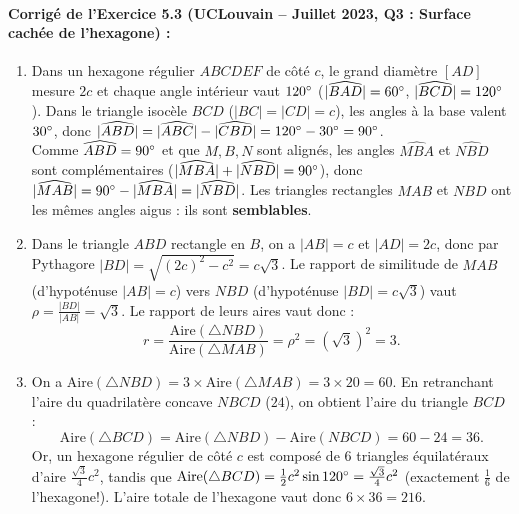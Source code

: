 \paragraph{Corrigé de l'Exercice 5.3 (UCLouvain -- Juillet 2023, Q3 : Surface cachée de l'hexagone) :}
\begin{enumerate}[label=(\alph*)]
    \item Dans un hexagone régulier $ABCDEF$ de côté $c$, le grand diamètre $[AD]$ mesure $2c$ et chaque angle intérieur vaut $120\degree$ ($|\widehat{BAD}| = 60\degree$, $|\widehat{BCD}| = 120\degree$). Dans le triangle isocèle $BCD$ ($|BC|=|CD|=c$), les angles à la base valent $30\degree$, donc $|\widehat{ABD}| = |\widehat{ABC}| - |\widehat{CBD}| = 120\degree - 30\degree = 90\degree$.\\
    Comme $\widehat{ABD} = 90\degree$ et que $M, B, N$ sont alignés, les angles $\widehat{MBA}$ et $\widehat{NBD}$ sont complémentaires ($|\widehat{MBA}| + |\widehat{NBD}| = 90\degree$), donc $|\widehat{MAB}| = 90\degree - |\widehat{MBA}| = |\widehat{NBD}|$. Les triangles rectangles $MAB$ et $NBD$ ont les mêmes angles aigus : ils sont \textbf{semblables}.
    \item Dans le triangle $ABD$ rectangle en $B$, on a $|AB| = c$ et $|AD| = 2c$, donc par Pythagore $|BD| = \sqrt{(2c)^2 - c^2} = c\sqrt{3}$. Le rapport de similitude de $MAB$ (d'hypoténuse $|AB| = c$) vers $NBD$ (d'hypoténuse $|BD| = c\sqrt{3}$) vaut $\rho = \frac{|BD|}{|AB|} = \sqrt{3}$. Le rapport de leurs aires vaut donc :
    \[
        r = \frac{\text{Aire}(\triangle NBD)}{\text{Aire}(\triangle MAB)} = \rho^2 = (\sqrt{3})^2 = \boxed{3}.
    \]
    \item On a $\text{Aire}(\triangle NBD) = 3 \times \text{Aire}(\triangle MAB) = 3 \times 20 = 60$. En retranchant l'aire du quadrilatère concave $NBCD$ ($24$), on obtient l'aire du triangle $BCD$ :
    \[
        \text{Aire}(\triangle BCD) = \text{Aire}(\triangle NBD) - \text{Aire}(NBCD) = 60 - 24 = 36.
    \]
    Or, un hexagone régulier de côté $c$ est composé de $6$ triangles équilatéraux d'aire $\frac{\sqrt{3}}{4}c^2$, tandis que $\text{Aire}(\triangle BCD) = \frac{1}{2}c^2\sin 120\degree = \frac{\sqrt{3}}{4}c^2$ (exactement $\frac{1}{6}$ de l'hexagone!). L'aire totale de l'hexagone vaut donc $6 \times 36 = \boxed{216}$.
\end{enumerate}

